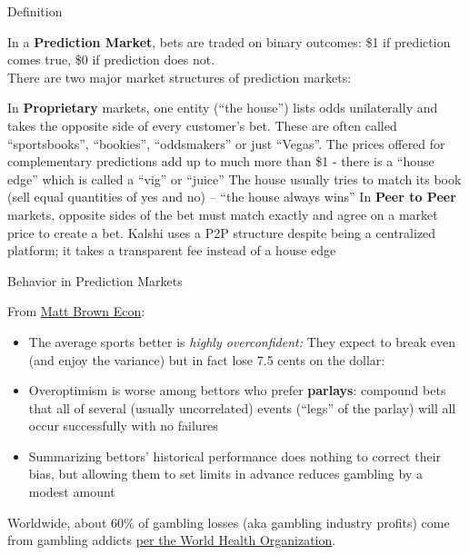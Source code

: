 \documentclass[aspectratio=169]{beamer}
\begin{document}
\begin{frame}{Definition}

In a \textbf{Prediction Market}, bets are traded on binary outcomes: \$1 if prediction comes true, \$0 if prediction does not. \\ 

There are two major market structures of prediction markets: 

\bi 
\m  In \textbf{Proprietary} markets, one entity (``the house'') lists odds unilaterally and takes the opposite side of every customer's bet. 
\bi 
\m These are often called ``sportsbooks'', ``bookies'', ``oddsmakers'' or just ``Vegas''. 
\m The prices offered for complementary predictions add up to much more than \$1 - there is a ``house edge'' which is called a ``vig'' or ``juice'' 
\m The house usually tries to match its book (sell equal quantities of yes and no) -- ``the house always wins'' \pause 
\ei 
\m In \textbf{Peer to Peer} markets, opposite sides of the bet must match exactly and agree on a market price to create a bet. 
\bi 
\m Kalshi uses a P2P structure despite being a centralized platform; it takes a transparent fee instead of a house edge 
\ei 
\ei 

\end{frame}


\begin{frame}{Behavior in Prediction Markets}

From \href{https://mattbrownecon.github.io/assets/papers/jmp/sportsbetting.pdf}{Matt Brown Econ}: 
\begin{itemize}
    \item The average sports better is \emph{highly overconfident:} They expect to break even (and enjoy the variance) but in fact lose 7.5 cents on the dollar: 
    \item Overoptimism is worse among bettors who prefer \textbf{parlays}: compound bets that all of several (usually uncorrelated) events (``legs'' of the parlay) will all occur successfully with no failures 
    \item Summarizing bettors' historical performance does nothing to correct their bias, but allowing them to set limits in advance reduces gambling by a modest amount 
\end{itemize}
Worldwide, about 60\% of gambling losses (aka gambling industry profits) come from gambling addicts \href{https://www.who.int/news-room/fact-sheets/detail/gambling}{per the World Health Organization}. 
    
\end{frame}
\end{document}
